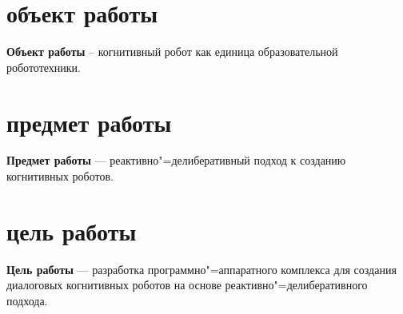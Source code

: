 \section{объект работы}
\textbf{Объект работы} -- когнитивный робот как единица образовательной робототехники.

\section{предмет работы}
\textbf{Предмет работы} --- реактивно"=делиберативный подход к созданию когнитивных роботов.

\section{цель работы}
\textbf{Цель работы} --- разработка программно"=аппаратного комплекса для создания диалоговых когнитивных роботов на основе реактивно"=делиберативного подхода.